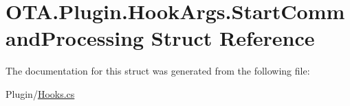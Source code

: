 \hypertarget{struct_o_t_a_1_1_plugin_1_1_hook_args_1_1_start_command_processing}{}\section{O\+T\+A.\+Plugin.\+Hook\+Args.\+Start\+Command\+Processing Struct Reference}
\label{struct_o_t_a_1_1_plugin_1_1_hook_args_1_1_start_command_processing}


The documentation for this struct was generated from the following file\+:\begin{DoxyCompactItemize}
\item 
Plugin/\hyperlink{_hooks_8cs}{Hooks.\+cs}\end{DoxyCompactItemize}

